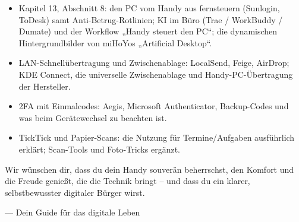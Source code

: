 
\begin{itemize}
  \item Kapitel 13, Abschnitt 8: den PC vom Handy aus fernsteuern (Sunlogin, ToDesk) samt Anti-Betrug-Rotlinien; KI im Büro (Trae / WorkBuddy / Dumate) und der Workflow „Handy steuert den PC“; die dynamischen Hintergrundbilder von miHoYos „Artificial Desktop“.
  \item LAN-Schnellübertragung und Zwischenablage: LocalSend, Feige, AirDrop; KDE Connect, die universelle Zwischenablage und Handy-PC-Übertragung der Hersteller.
  \item 2FA mit Einmalcodes: Aegis, Microsoft Authenticator, Backup-Codes und was beim Gerätewechsel zu beachten ist.
  \item TickTick und Papier-Scans: die Nutzung für Termine/Aufgaben ausführlich erklärt; Scan-Tools und Foto-Tricks ergänzt.
\end{itemize}

Wir wünschen dir, dass du dein Handy souverän beherrschst, den Komfort und die Freude genießt, die die Technik bringt – und dass du ein klarer, selbstbewusster digitaler Bürger wirst.

— Dein Guide für das digitale Leben
